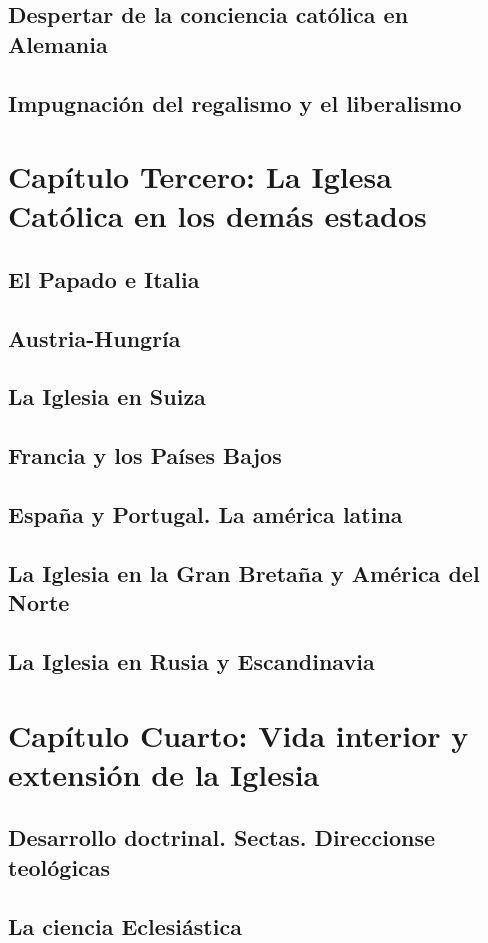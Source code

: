 \raggedbottom{} \documentclass[12pt]{book}
\begin{document}
\section{Despertar de la conciencia católica en Alemania}
\section{Impugnación del regalismo y el liberalismo}
\chapter{Capítulo Tercero: La Iglesa Católica en los demás estados}
\section{El Papado e Italia}
\section{Austria-Hungría}
\section{La Iglesia en Suiza}
\section{Francia y los Países Bajos}
\section{España y Portugal. La américa latina}
\section{La Iglesia en la Gran Bretaña y América del Norte}
\section{La Iglesia en Rusia y Escandinavia}
\chapter{Capítulo Cuarto: Vida interior y extensión de la Iglesia}
\section{Desarrollo doctrinal. Sectas. Direccionse teológicas}
\section{La ciencia Eclesiástica}
\end{document}
